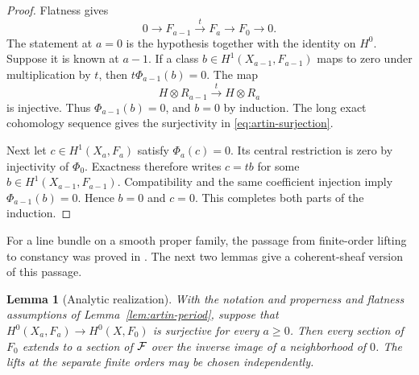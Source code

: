 \documentclass[11pt,a4paper]{article}
\numberwithin{equation}{section}
\newtheorem{lemma}[theorem]{Lemma}
\theoremstyle{definition}
\theoremstyle{remark}
\begin{document}
\begin{proof}
Flatness gives
\[
 0\longrightarrow F_{a-1}\xrightarrow{\ t\ }F_a
 \longrightarrow F_0\longrightarrow0.
\]
The statement at $a=0$ is the hypothesis together with the identity on
$H^0$. Suppose it is known at $a-1$. If a class
$b\in H^1(X_{a-1},F_{a-1})$ maps to zero under multiplication by $t$,
then $t\Phi_{a-1}(b)=0$. The map
\[
 H\otimes R_{a-1}\xrightarrow{\ t\ }H\otimes R_a
\]
is injective. Thus $\Phi_{a-1}(b)=0$, and $b=0$ by induction. The long
exact cohomology sequence gives the surjectivity in
\eqref{eq:artin-surjection}.

Next let $c\in H^1(X_a,F_a)$ satisfy $\Phi_a(c)=0$. Its central
restriction is zero by injectivity of $\Phi_0$. Exactness therefore
writes $c=tb$ for some $b\in H^1(X_{a-1},F_{a-1})$. Compatibility and
the same coefficient injection imply $\Phi_{a-1}(b)=0$. Hence $b=0$
and $c=0$. This completes both parts of the induction.
\end{proof}

For a line bundle on a smooth proper family, the passage from
finite-order lifting to constancy was proved in
\cite[Lemma~1.1]{Levine1983}. The next two lemmas give a
coherent-sheaf version of this passage.

\begin{lemma}[Analytic realization]\label{lem:analytic-lift}
With the notation and properness and flatness assumptions of
Lemma~\ref{lem:artin-period}, suppose that
$H^0(X_a,F_a)\to H^0(X,F_0)$ is surjective for every $a\ge0$.
Then every section of $F_0$ extends to a section of $\mathcal F$ over the
inverse image of a neighborhood of $0$. The lifts at the separate
finite orders may be chosen independently.
\end{lemma}
\end{document}
